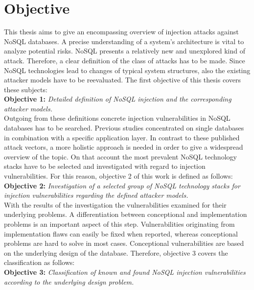 \section{Objective}
\label{sec:objective}
This thesis aims to give an encompassing overview of injection attacks against NoSQL databases. A precise understanding of a system's architecture is vital to analyze potential risks. NoSQL presents a relatively new and unexplored kind of attack. Therefore, a clear definition of the class of attacks has to be made. Since NoSQL technologies lead to changes of typical system structures, also the existing attacker models have to be reevaluated. The first objective of this thesis covers these subjects: \\

\textbf{Objective 1:} \textit{Detailed definition of NoSQL injection and the corresponding attacker models.} \\

Outgoing from these definitions concrete injection vulnerabilities in NoSQL databases has to be searched. Previous studies concentrated on single databases in combination with a specific application layer. In contrast to these published attack vectors, a more holistic approach is needed in order to give a widespread overview of the topic. On that account the most prevalent NoSQL technology stacks have to be selected and investigated with regard to injection vulnerabilities. For this reason, objective 2 of this work is defined as follows: \\

\textbf{Objective 2:} \textit{Investigation of a selected group of NoSQL technology stacks for injection vulnerabilities regarding the defined attacker models.} \\

With the results of the investigation the vulnerabilities examined for their underlying problems. A differentiation between conceptional and implementation problems is an important aspect of this step. Vulnerabilities originating from implementation flaws can easily be fixed when reported, whereas conceptional problems are hard to solve in most cases. Conceptional vulnerabilities are based on the underlying design of the database. Therefore, objective 3 covers the classification as follows: \\

\textbf{Objective 3:} \textit{Classification of known and found NoSQL injection vulnerabilities according to the underlying design problem.} \\

